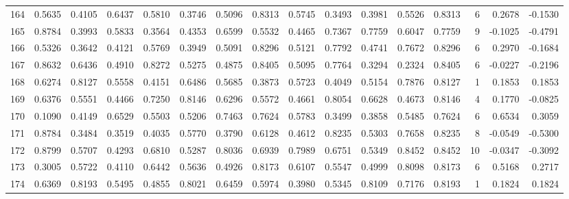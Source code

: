 \begin{tabular}{lrrrrrrrrrrrrrrr}
164 &      0.5635 &  0.4105 &  0.6437 &  0.5810 &  0.3746 &  0.5096 &  0.8313 &  0.5745 &  0.3493 &  0.3981 &   0.5526 &     0.8313 &      6 &                    0.2678 &                    -0.1530 \\
165 &      0.8784 &  0.3993 &  0.5833 &  0.3564 &  0.4353 &  0.6599 &  0.5532 &  0.4465 &  0.7367 &  0.7759 &   0.6047 &     0.7759 &      9 &                   -0.1025 &                    -0.4791 \\
166 &      0.5326 &  0.3642 &  0.4121 &  0.5769 &  0.3949 &  0.5091 &  0.8296 &  0.5121 &  0.7792 &  0.4741 &   0.7672 &     0.8296 &      6 &                    0.2970 &                    -0.1684 \\
167 &      0.8632 &  0.6436 &  0.4910 &  0.8272 &  0.5275 &  0.4875 &  0.8405 &  0.5095 &  0.7764 &  0.3294 &   0.2324 &     0.8405 &      6 &                   -0.0227 &                    -0.2196 \\
168 &      0.6274 &  0.8127 &  0.5558 &  0.4151 &  0.6486 &  0.5685 &  0.3873 &  0.5723 &  0.4049 &  0.5154 &   0.7876 &     0.8127 &      1 &                    0.1853 &                     0.1853 \\
169 &      0.6376 &  0.5551 &  0.4466 &  0.7250 &  0.8146 &  0.6296 &  0.5572 &  0.4661 &  0.8054 &  0.6628 &   0.4673 &     0.8146 &      4 &                    0.1770 &                    -0.0825 \\
170 &      0.1090 &  0.4149 &  0.6529 &  0.5503 &  0.5206 &  0.7463 &  0.7624 &  0.5783 &  0.3499 &  0.3858 &   0.5485 &     0.7624 &      6 &                    0.6534 &                     0.3059 \\
171 &      0.8784 &  0.3484 &  0.3519 &  0.4035 &  0.5770 &  0.3790 &  0.6128 &  0.4612 &  0.8235 &  0.5303 &   0.7658 &     0.8235 &      8 &                   -0.0549 &                    -0.5300 \\
172 &      0.8799 &  0.5707 &  0.4293 &  0.6810 &  0.5287 &  0.8036 &  0.6939 &  0.7989 &  0.6751 &  0.5349 &   0.8452 &     0.8452 &     10 &                   -0.0347 &                    -0.3092 \\
173 &      0.3005 &  0.5722 &  0.4110 &  0.6442 &  0.5636 &  0.4926 &  0.8173 &  0.6107 &  0.5547 &  0.4999 &   0.8098 &     0.8173 &      6 &                    0.5168 &                     0.2717 \\
174 &      0.6369 &  0.8193 &  0.5495 &  0.4855 &  0.8021 &  0.6459 &  0.5974 &  0.3980 &  0.5345 &  0.8109 &   0.7176 &     0.8193 &      1 &                    0.1824 &                     0.1824 \\

\end{tabular}
